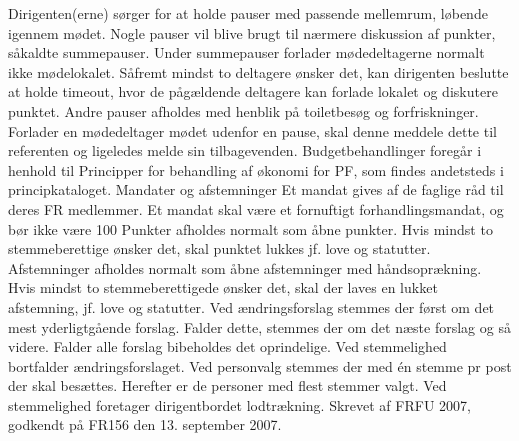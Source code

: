 Dirigenten(erne) sørger for at holde pauser med passende mellemrum, løbende igennem mødet. Nogle pauser vil blive
brugt til nærmere diskussion af punkter, såkaldte summepauser. Under summepauser forlader mødedeltagerne normalt
ikke mødelokalet. Såfremt mindst to deltagere ønsker det, kan dirigenten beslutte at holde timeout, hvor de pågældende
deltagere kan forlade lokalet og diskutere punktet. Andre pauser afholdes med henblik på toiletbesøg og forfriskninger.
Forlader en mødedeltager mødet udenfor en pause, skal denne meddele dette til referenten og ligeledes melde sin
tilbagevenden.
Budgetbehandlinger foregår i henhold til Principper for behandling af økonomi for PF, som findes andetsteds i
principkataloget.
Mandater og afstemninger
Et mandat gives af de faglige råd til deres FR medlemmer. Et mandat skal være et fornuftigt forhandlingsmandat, og bør
ikke være 100 %
Punkter afholdes normalt som åbne punkter. Hvis mindst to stemmeberettige ønsker det, skal punktet lukkes jf. love og
statutter.
Afstemninger afholdes normalt som åbne afstemninger med håndsoprækning. Hvis mindst to stemmeberettigede ønsker
det, skal der laves en lukket afstemning, jf. love og statutter.
Ved ændringsforslag stemmes der først om det mest yderligtgående forslag. Falder dette, stemmes der om det næste
forslag og så videre. Falder alle forslag bibeholdes det oprindelige. Ved stemmelighed bortfalder ændringsforslaget.
Ved personvalg stemmes der med én stemme pr post der skal besættes. Herefter er de personer med flest stemmer valgt.
Ved stemmelighed foretager dirigentbordet lodtrækning.
Skrevet af FRFU 2007, godkendt på FR156 den 13. september 2007.
